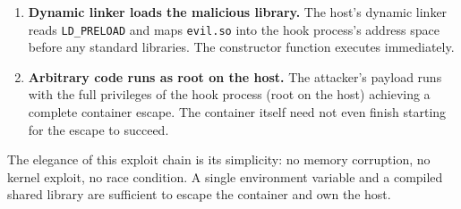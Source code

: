 \begin{enumerate}
  \item \textbf{Dynamic linker loads the malicious library.} The host's dynamic linker reads \texttt{LD\_PRELOAD} and maps \texttt{evil.so} into the hook process's address space before any standard libraries. The constructor function executes immediately.
 
  \item \textbf{Arbitrary code runs as root on the host.} The attacker's payload runs with the full privileges of the hook process (root on the host) achieving a complete container escape. The container itself need not even finish starting for the escape to succeed.
\end{enumerate}

The elegance of this exploit chain is its simplicity: no memory corruption, no kernel exploit, no race condition. A single environment variable and a compiled shared library are sufficient to escape the container and own the host.